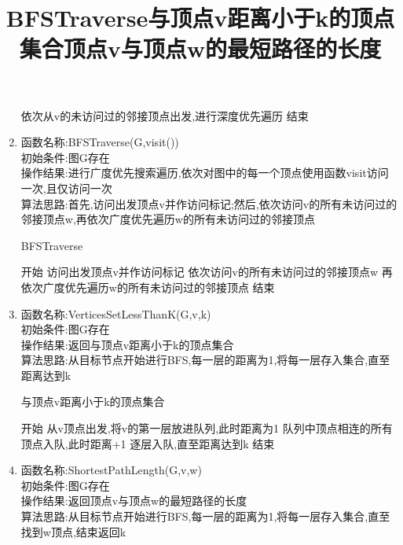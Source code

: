 \documentclass[supercite]{HustGraduPaper}
\theoremstyle{definition}
\begin{document}
\begin{enumerate}
\begin{algorithm}[htb]
\begin{algorithmic}[1]
			      \State 依次从v的未访问过的邻接顶点出发,进行深度优先遍历
			      \State 结束
		      \end{algorithmic}\label{G11}
	      \end{algorithm}
	\item 函数名称:BFSTraverse(G,visit())\\
	      初始条件:图G存在\\
	      操作结果:进行广度优先搜索遍历,依次对图中的每一个顶点使用函数visit访问一次,且仅访问一次\\
	      算法思路:首先,访问出发顶点v并作访问标记;然后,依次访问v的所有未访问过的邻接顶点w,再依次广度优先遍历w的所有未访问过的邻接顶点
	      \begin{algorithm}[htb]
		      \title{BFSTraverse}
		      \caption{BFSTraverse}
		      \begin{algorithmic}[1]
			      \State 开始
			      \State 访问出发顶点v并作访问标记
			      \State 依次访问v的所有未访问过的邻接顶点w
			      \State 再依次广度优先遍历w的所有未访问过的邻接顶点
			      \State 结束
		      \end{algorithmic}\label{G12}
	      \end{algorithm}
	\item 函数名称:VerticesSetLessThanK(G,v,k)\\
	      初始条件:图G存在\\
	      操作结果:返回与顶点v距离小于k的顶点集合\\
	      算法思路:从目标节点开始进行BFS,每一层的距离为1,将每一层存入集合,直至距离达到k
	      \begin{algorithm}[htb]
		      \title{与顶点v距离小于k的顶点集合}
		      \caption{与顶点v距离小于k的顶点集合}
		      \begin{algorithmic}[1]
			      \State 开始
			      \State 从v顶点出发,将v的第一层放进队列,此时距离为1
			      \State 队列中顶点相连的所有顶点入队,此时距离+1
			      \State 逐层入队,直至距离达到k
			      \State 结束
		      \end{algorithmic}\label{G13}
	      \end{algorithm}
	\item 函数名称:ShortestPathLength(G,v,w)\\
	      初始条件:图G存在\\
	      操作结果:返回顶点v与顶点w的最短路径的长度\\
	      算法思路:从目标节点开始进行BFS,每一层的距离为1,将每一层存入集合,直至找到w顶点,结束返回k
	      \begin{algorithm}[htb]
		      \title{顶点v与顶点w的最短路径的长度}

\end{algorithm}
\end{enumerate}
\end{document}
